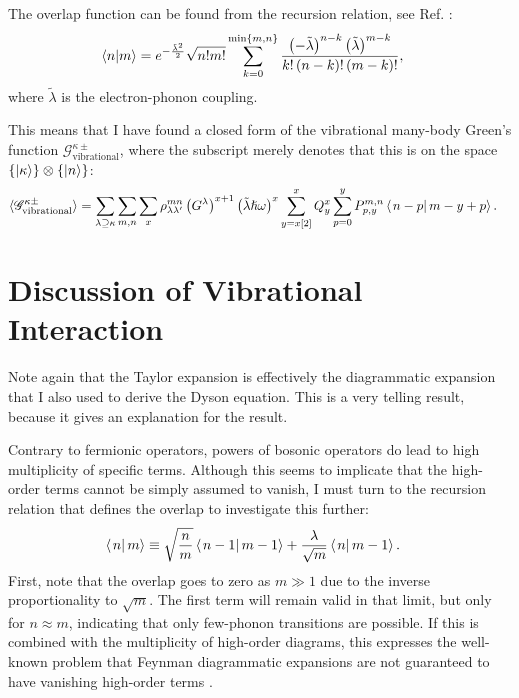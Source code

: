 The overlap function can be found from the recursion relation, see Ref. \cite{kaspermothpoulsen}:
\begin{align*}
\braket{n|m} &= e^{-\frac{\tilde{\lambda}^2}{2}} \sqrt{n! m!} \sum_{k=0}^{ \text{min}\left\{ m, n \right\}} \frac{ \left(-\tilde{\lambda}\right)^{n-k} \left(\tilde{\lambda}\right)^{m-k}}{ k! \left( n -k\right)! \left( m - k \right)!},
\end{align*} 
where $\tilde{\lambda}$ is the electron-phonon coupling.

This means that I have found a closed form of the vibrational many-body Green's function $\mathscr{G}^{\kappa\pm}_\text{vibrational}$, where the subscript merely denotes that this is on the space $\left\{\ket{\kappa}\right\} \otimes \left\{\ket{n}\right\}$:
\begin{align}
\braket{\mathscr{G}^{\kappa\pm}_\text{vibrational}}&= \sum_{\lambda\supseteq \kappa} \sum_{m,n} \sum_x\rho_{\lambda\lambda^\prime}^{mn}  \left(G^\lambda \right)^{x+1} \left(\tilde{\lambda}\hslash\omega\right)^x
 \sum_{y=x[2]}^x Q^x_y \sum_{p=0}^{y} P^{m,n}_{p,y} \braket{\left. n-p \right| m-y+p} \label{eq:vibgf}.
\end{align}

\section{Discussion of Vibrational Interaction}
\label{sec:phononicdiscussion}

Note again that the Taylor expansion is effectively the diagrammatic expansion that I also used to derive the Dyson equation. This is a very telling result, because it gives an explanation for the result.

Contrary to fermionic operators, powers of bosonic operators do lead to high multiplicity of specific terms. Although this seems to implicate that the high-order terms cannot be simply assumed to vanish, I must turn to the recursion relation that defines the overlap to investigate this further:
\begin{align*}
\braket{\left. n\right|m} &\equiv \sqrt{\frac{n}{m}} \braket{\left. n-1\right|m-1} + \frac{\lambda}{\sqrt{m}} \braket{\left. n\right|m-1}.
\end{align*}
First, note that the overlap goes to zero as $m\gg 1$ due to the inverse proportionality to $\sqrt{m}$. The first term will remain valid in that limit, but only for $n\approx m$, indicating that only few-phonon transitions are possible. If this is combined with the multiplicity of high-order diagrams, this expresses the well-known problem that Feynman diagrammatic expansions are not guaranteed to have vanishing high-order terms \cite{mattuck}.

